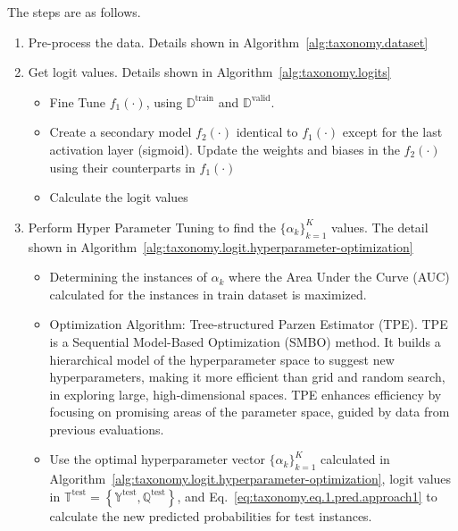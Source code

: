 \documentclass[review,1p,times,numbers]{elsarticle}
\begin{document}
The steps are as follows.
\begin{enumerate}
    \item Pre-process the data. Details shown in Algorithm~\ref{alg:taxonomy.dataset}
    \item Get logit values. Details shown in Algorithm~\ref{alg:taxonomy.logits}
    \begin{itemize}
        \item Fine Tune $f_1(\cdot)$, using $\mathbb{D}^{\text{train}}$ and $\mathbb{D}^{\text{valid}}$.
        \item Create a secondary model $f_2 (\cdot)$ identical to $f_1(\cdot)$ except for the last activation layer (sigmoid). Update the weights and biases in the $f_2 (\cdot)$ using their counterparts in $f_1(\cdot)$
        \item Calculate the logit values
    \end{itemize}
    \item Perform Hyper Parameter Tuning to find the ${\{\alpha_k \}}_{k=1}^K$ values. The detail shown in Algorithm~\ref{alg:taxonomy.logit.hyperparameter-optimization}
    \begin{itemize}
        \item Determining the instances of $\alpha_k$ where the Area Under the Curve (AUC) calculated for the instances in train dataset is maximized.
        \item Optimization Algorithm: Tree-structured Parzen Estimator (TPE). TPE is a Sequential Model-Based Optimization (SMBO) method. It builds a hierarchical model of the hyperparameter space to suggest new hyperparameters, making it more efficient than grid and random search, in exploring large, high-dimensional spaces. TPE enhances efficiency by focusing on promising areas of the parameter space, guided by data from previous evaluations.
        \item Use the optimal hyperparameter vector ${\{\alpha_k \}}_{k=1}^K$ calculated in Algorithm~\ref{alg:taxonomy.logit.hyperparameter-optimization}, logit values in $\mathbb{T}^{\text{test}}=\left\{ \mathbb{Y}^{\text{test}}, \mathbb{Q}^{\text{test}} \right\}$, and Eq.~\ref{eq:taxonomy.eq.1.pred.approach1} to calculate the new predicted probabilities for test instances.
    \end{itemize}
\end{enumerate}
\end{document}
